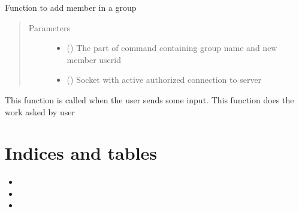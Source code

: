 \documentclass[letterpaper,10pt,english]{sphinxmanual}
\begin{document}

\begin{fulllineitems}
\label{\detokenize{userInputHandler:userInputHandler.addMemberInGroup}}
Function to add member in a group
\begin{quote}\begin{description}
\item[{Parameters}] \leavevmode\begin{itemize}
\item {} 
 () \textendash{} The part of command containing group name and new member userid

\item {} 
 () \textendash{} Socket with active authorized connection to server

\end{itemize}

\end{description}\end{quote}

\end{fulllineitems}


\begin{fulllineitems}
\label{\detokenize{userInputHandler:userInputHandler.handleUserInput}}
This function is called when the user sends some input. This function does the work asked by user

\end{fulllineitems}



\chapter{Indices and tables}
\label{\detokenize{index:indices-and-tables}}\begin{itemize}
\item {} 

\item {} 

\item {} 

\end{itemize}
\end{document}
